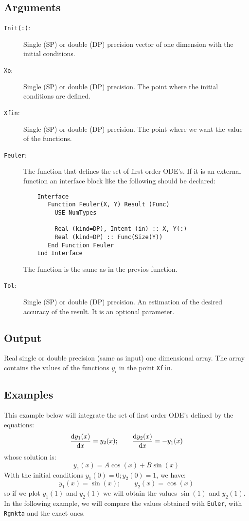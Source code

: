 \subsection{Arguments}

\begin{description}
\item[\texttt{Init(:)}:] Single (SP) or double (DP) precision vector of
  one dimension with the initial conditions.
\item[\texttt{Xo}:] Single (SP) or double (DP) precision. The point
  where the initial conditions are defined.
\item[\texttt{Xfin}:] Single (SP) or double (DP) precision. The point
  where we want the value of the functions.
\item[\texttt{Feuler}:] The function that defines the set of first order
  ODE's. If it is an external function an interface block like the
  following should be declared: 
\begin{verbatim}
    Interface
       Function Feuler(X, Y) Result (Func)
         USE NumTypes

         Real (kind=DP), Intent (in) :: X, Y(:)
         Real (kind=DP) :: Func(Size(Y))
       End Function Feuler
    End Interface
\end{verbatim}
The function is the same as in the previos function.
\item[\texttt{Tol}:] Single (SP) or double (DP) precision. An
  estimation of the desired accuracy of the result. It is an optional
  parameter.
\end{description}

\subsection{Output}

Real single or double precision (same as input) one dimensional
array. The array contains the values of the functions $y_i$ in the
point \texttt{Xfin}. 

\subsection{Examples}

This example below will integrate the set of first order ODE's defined
by the equations:
\begin{displaymath}
  \frac{\mathrm{d} y_1(x)}{\mathrm{d} x} = y_2(x);\qquad
  \frac{\mathrm{d} y_2(x)}{\mathrm{d} x} = -y_1(x)    
\end{displaymath}
whose solution is:
\begin{displaymath}
  y_1(x) = A\cos(x) + B\sin(x)
\end{displaymath}
With the initial conditions $y_1(0) = 0; y_2(0)=1$, we have:
\begin{displaymath}
  y_1(x) = \sin(x);\qquad y_2(x) = \cos(x)
\end{displaymath}
so if we plot $y_1(1)$ and $y_2(1)$ we will obtain the values
$\sin(1)$ and $y_2(1)$. In the following example, we will compare the
values obtained with \texttt{Euler}, with \texttt{Rgnkta} and the
exact ones. 

